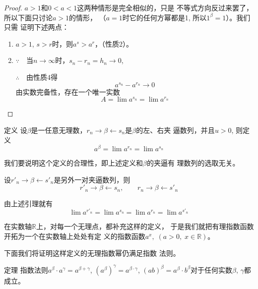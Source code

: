 \begin{proof}
  $a>1$和$0<a<1$这两种情形是完全相似的，只是
不等式方向反过来罢了，所以下面只讨论$a>1$的情形，
（$a=1$时它的任何方幂都是1, 所以$1^{\beta}=1$）。我们只需
证明下述两点：
\begin{enumerate}
  \item $a>1$, $s>r$时，则$a^s>a^r$，（性质2）。
  \item $\because\quad $当$n\to\infty$时，$s_n-r_n=h_n\to 0$,
  
  $\therefore\quad $由性质4得
\[  a^{s_n}-a^{r_n}\to 0\]
  由实数完备性，存在一个唯一实数
 \[ A=\lim a^{s_n}=\lim a^{r_n}\]
\end{enumerate}
\end{proof}

\begin{blk}{定义}
  设$\beta$是一任意无理数，$r_n\to\beta\leftarrow s_n$是$\beta$的左、右夹
逼数列，并且$u>0$, 则定义
\[a^{\beta}=\lim a^{r_n}=\lim a^{s_n}\]
\end{blk}


我们要说明这个定义的合理性，即上述定义和$\beta$的夹逼有
理数列的选取无关。

设$r'_n\to\beta\leftarrow s'_n$是另外一对夹逼数列，则
\[r'_n\to\beta \leftarrow s_n,\qquad r_n\to\beta\leftarrow s'_n\]

由上述引理就有
\[\lim a^{r'_n}=\lim a^{s_n}=\lim a^{r_n}=\lim a^{s'_n}\]

在实数轴$\mathbb{R}$上，对每一个无理点，都补充这样的定义，
于是我们就把有理指数函数开拓为一个在实数轴上处处有定
义的指数函数$a^x,\; (a>0,\; x\in\mathbb{R})$。

下面我们将证明这样定义的无理指数幂仍满足指数
法则。

\begin{blk}{定理}
  指数法则$a^{\beta}\cdot a^{\gamma}=a^{\beta+\gamma}$, $\left(a^{\beta}\right)^{\gamma}=a^{\beta\cdot \gamma}$, $(ab)^{\beta}=a^{\beta}\cdot b^{\beta}$对于任何实数$\beta$, $\gamma$都成立。
\end{blk}
 
